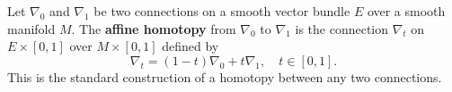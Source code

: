 Let $\nabla_0$ and $\nabla_1$ be two connections on a smooth vector bundle $E$ over a smooth manifold $M$. The \textbf{affine homotopy} from $\nabla_0$ to $\nabla_1$ is the connection $\nabla_t$ on $E \times [0,1]$ over $M \times [0,1]$ defined by
$$
\nabla_t = (1-t)\nabla_0 + t\nabla_1, \quad t \in [0,1].
$$
This is the standard construction of a homotopy between any two connections.
